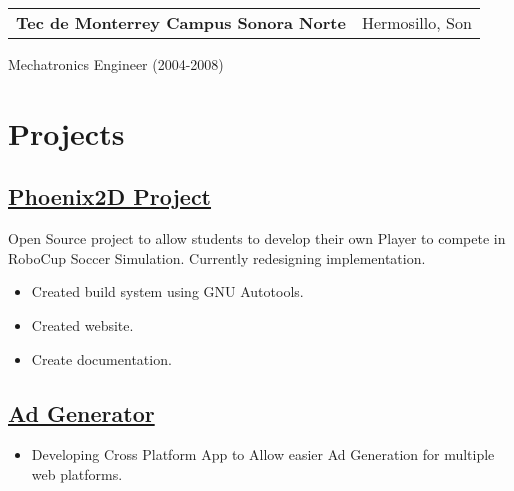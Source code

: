 \documentclass{scrartcl}
\begin{document}
\noindent
\begin{tabular*}{1\textwidth}{@{\extracolsep{\fill}}lr}
\textbf{Tec de Monterrey Campus Sonora Norte }& Hermosillo, Son
\end{tabular*}
Mechatronics Engineer (2004-2008) 

\section*{Projects}

\subsection*{\href{http://claudiordgz.github.io/Phoenix2D/}{Phoenix2D Project}}

Open Source project to allow students to develop their own Player to compete in RoboCup Soccer Simulation. Currently redesigning implementation.
\begin{itemize}[leftmargin=*]
	\setlength{\itemsep}{1pt}
  \setlength{\parskip}{0pt}
  \setlength{\parsep}{0pt}
	\item Created build system using GNU Autotools.
	\item Created website.
	\item Create documentation.
\end{itemize}

\subsection*{\href{https://github.com/claudiordgz/AdGenerator}{Ad Generator}}

\begin{itemize}[leftmargin=*]
	\setlength{\itemsep}{6pt}
  \setlength{\parskip}{0pt}
  \setlength{\parsep}{0pt}
  	\item Developing Cross Platform App to Allow easier Ad Generation for multiple web platforms. 
\end{itemize}
\end{document}
